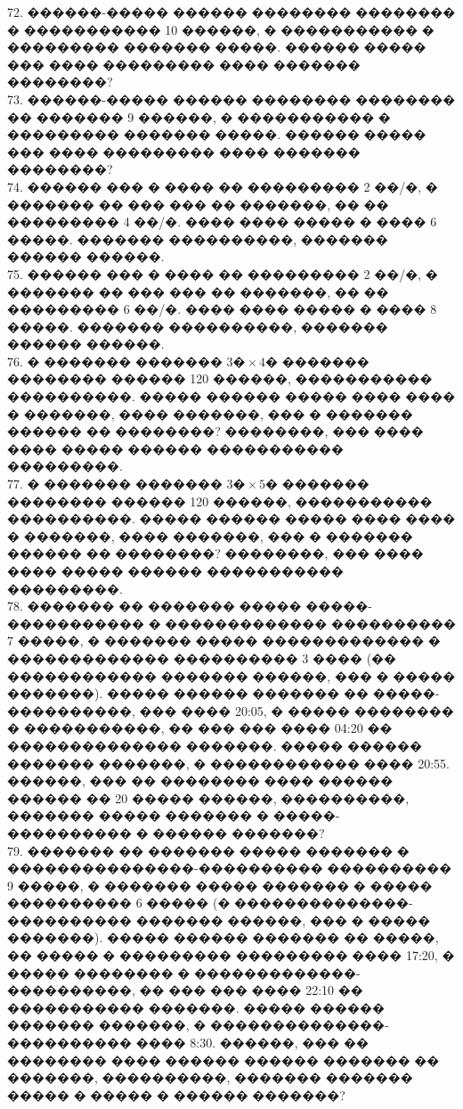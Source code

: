 \documentclass[12pt]{article}
\begin{document}
72. ������-����� ������ �������� �������� � ����������� 10 ������, � ����������� � ��������� ������� �����. ������ ����� ��� ���� ��������� ���� ������� ��������?\\
73. ������-����� ������ �������� �������� �� ������� 9 ������, � ����������� � ��������� ������� �����. ������ ����� ��� ���� ��������� ���� ������� ��������?\\
74. ������ ��� � ���� �� ��������� 2 ��/�, � ������� �� ��� ��� �� �������, �� �� ��������� 4 ��/�. ���� ���� ����� � ���� 6 �����. ������� ����������, ������� ������ ������.\\
75. ������ ��� � ���� �� ��������� 2 ��/�, � ������� �� ��� ��� �� �������, �� �� ��������� 6 ��/�. ���� ���� ����� � ���� 8 �����. ������� ����������, ������� ������ ������.\\
76. � ������� ������� $3\text{�}\times4\text{�}$ ������� �������� ������ 120 ������, ����������� ����������. ����� ������ ����� ���� ���� � �������, ���� �������, ��� � ������� ������ �� ��������? ��������, ��� ���� ���� ����� ������ ����������� ���������.\\
77. � ������� ������� $3\text{�}\times5\text{�}$ ������� �������� ������ 120 ������, ����������� ����������. ����� ������ ����� ���� ���� � �������, ���� �������, ��� � ������� ������ �� ��������? ��������, ��� ���� ���� ����� ������ ����������� ���������.\\
78. ������� �� ������� ����� �����-����������� � ������������� ���������� 7 �����, � ������� ����� ������������� � ������������� ���������� 3 ���� (�� ������������ ������� ������, ��� � ����� �������). ����� ������ ������� �� �����-����������, ��� ���� 20:05, � ����� �������� � �����������, �� ��� ��� ���� 04:20 �� �������������� �������. ����� ������ ������� �������, � ������������ ���� 20:55. ������, ��� �� �������� ���� ������ ������ �� 20 ����� ������, ����������, ������� ����� ������� � �����-���������� � ������ �������?\\
79. ������� �� ������� ����� ������� � ���������������-���������� ���������� 9 �����, � ������� ����� ������� � ����� ���������� 6 ����� (� ��������������-���������� ������� ������, ��� � ����� �������). ����� ������ ������� �� �����, �� ����� � ��������� ��������� ���� 17:20, � ����� �������� � �������������-����������, �� ��� ��� ���� 22:10 �� ����������� �������. ����� ������ ������� �������, � ��������������-���������� ���� 8:30. ������, ��� �� �������� ���� ������ ������ ������� �� �������, ����������, ������� ������� ����� � ����� � ������ �������?\\
\end{document}
